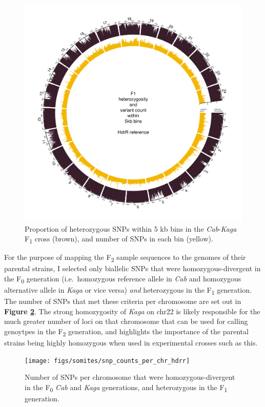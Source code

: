 \documentclass[
]{book}
\begin{document}
\begin{figure}
\includegraphics[width=1\linewidth]{figs/somites/F1} \caption{Proportion of heterozygous SNPs within 5 kb bins in the \emph{Cab}-\emph{Kaga} F\textsubscript{1} cross (brown), and number of SNPs in each bin (yellow).}\label{fig:somite-f1}
\end{figure}

For the purpose of mapping the F\textsubscript{2} sample sequences to the genomes of their parental strains, I selected only biallelic SNPs that were homozygous-divergent in the F\textsubscript{0} generation (i.e.~homozygous reference allele in \emph{Cab} and homozygous alternative allele in \emph{Kaga} or vice versa) \emph{and} heterozygous in the F\textsubscript{1} generation. The number of SNPs that met these criteria per chromosome are set out in \textbf{Figure \ref{fig:snp-counts-per-chrom}}. The strong homozygosity of \emph{Kaga} on chr22 is likely responsible for the much greater number of loci on that chromosome that can be used for calling genoytpes in the F\textsubscript{2} generation, and highlights the importance of the parental strains being highly homozygous when used in experimental crosses such as this.



\begin{figure}
\texttt{[image: figs/somites/snp\_counts\_per\_chr\_hdrr]} \caption{Number of SNPs per chromosome that were homozygous-divergent in the F\textsubscript{0} \emph{Cab} and \emph{Kaga} generations, and heterozygous in the F\textsubscript{1} generation.}\label{fig:snp-counts-per-chrom}
\end{figure}
\end{document}
